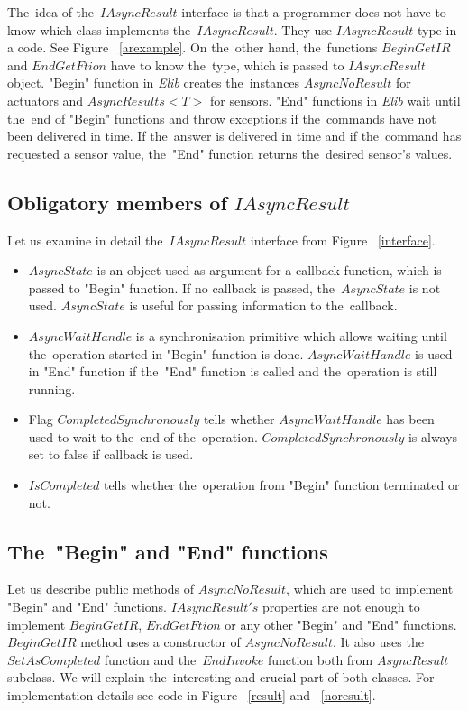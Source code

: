   
  The~idea of the~$IAsyncResult$ interface is that a programmer does not have to know which
  class implements the~$IAsyncResult$. They use $IAsyncResult$ type in a code. See Figure ~\ref{arexample}. 
  On the~other hand, the~functions $BeginGetIR$ and $EndGetFtion$ have to know the~type, which is passed to $IAsyncResult$ object.
  "Begin" function in {\it Elib} creates the~instances $AsyncNoResult$ for actuators and $AsyncResults<T>$ for sensors.
  "End" functions in {\it Elib} wait until the~end of "Begin" functions and 
  throw exceptions if the~commands have not been delivered in time.
  If the~answer is delivered in time and if the~command has requested a sensor value, 
  the~"End" function returns the~desired sensor's values.
  
\subsection*{Obligatory members of $IAsyncResult$} \label{sec:iasyncmemb}
  Let us examine in detail the~$IAsyncResult$ interface from Figure ~\ref{interface}. 
  \begin{itemize}
  \item $AsyncState$ is an object used as argument for a callback function, which
  is passed to "Begin" function. If no callback is passed, the~$AsyncState$ is not used. 
  $AsyncState$ is useful for passing information to the~callback.
  \item $AsyncWaitHandle$ is a synchronisation primitive which allows waiting until the~operation 
  started in "Begin" function is done.
  $AsyncWaitHandle$ is used in "End" function if the~"End" function is called 
  and the~operation is still running. 
  \item Flag $CompletedSynchronously$ tells whether  
  $AsyncWaitHandle$ has been used to wait to the~end of the~operation.
  $CompletedSynchronously$ is always set to false if callback is used.
  \item $IsCompleted$ tells whether the~operation from "Begin" function terminated or not.
  \end{itemize}

\subsection*{The~"Begin" and "End" functions} \label{sec:beginend}
  Let us describe public methods of $AsyncNoResult$, 
  which are used to implement "Begin" and "End" functions.
  $IAsyncResult's$ properties are not enough to implement $BeginGetIR$,
  $EndGetFtion$ or any other "Begin" and "End" functions.
  $BeginGetIR$ method uses a constructor of $AsyncNoResult$. 
  It also uses the~$SetAsCompleted$ function 
  and the~$EndInvoke$ function both from $AsyncResult$ subclass.
  We will explain the~interesting and crucial part of both classes. 
  For implementation details see code in Figure ~\ref{result} and ~\ref{noresult}.
  
